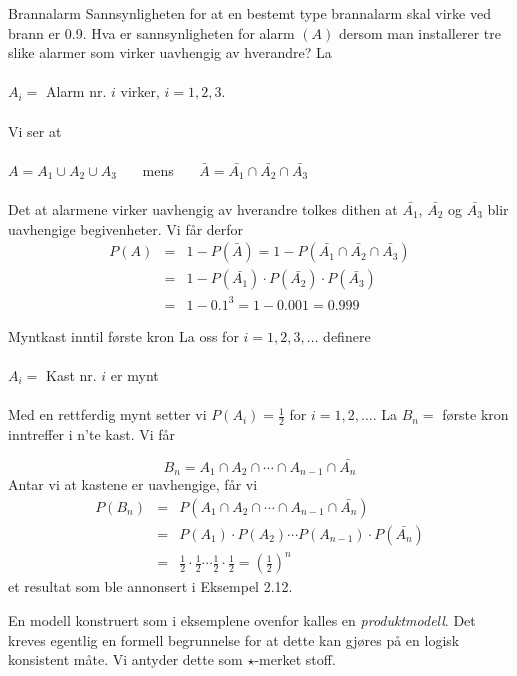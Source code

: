 \begin{eksempel}{Brannalarm}
Sannsynligheten for at en bestemt type brannalarm skal virke ved
brann er 0.9. Hva er sannsynligheten for alarm $(A)$ dersom man
installerer tre slike alarmer som virker uavhengig av hverandre?
La \\ \\
\indent  $A_i=$ Alarm nr. $i$ virker, $i=1,2,3$. \\ \\
\noindent Vi ser at \\ \\
\indent $A=A_1\cup A_2\cup A_3$  \ \ \ mens \ \ \
              $\bar{A}=\bar{A_1} \cap \bar{A_2} \cap \bar{A_3}$  \\ \\
Det at alarmene virker uavhengig av hverandre tolkes dithen at
 $\bar{A_1}$, $\bar{A_2}$ og $\bar{A_3}$ blir uavhengige begivenheter.
 Vi får derfor
 \begin{eqnarray*}
 P(A)&=&1-P(\bar{A})=1-P(\bar{A_1} \cap \bar{A_2} \cap \bar{A_3}) \\
     &=&1-P(\bar{A_1}) \cdot P(\bar{A_2}) \cdot P(\bar{A_3}) \\
     &=&1-0.1^3=1-0.001=0.999 
\end{eqnarray*}
\end{eksempel}

\begin{eksempel}{Myntkast inntil første kron}
La oss for $i=1,2,3,\ldots$ definere \\ \\
\indent     $A_i=$ Kast nr. $i$ er mynt \\ \\
Med en rettferdig mynt setter vi $P(A_i)=\frac{1}{2}$  for
$i=1,2,\ldots$.
La $B_n=$ første kron inntreffer i n'te kast. Vi får

\[  B_n=A_1\cap A_2\cap \cdots \cap A_{n-1}\cap \bar{A_n} \]
Antar vi at kastene er uavhengige, får vi
\begin{eqnarray*}
 P(B_n)&=&P(A_1\cap A_2\cap \cdots \cap A_{n-1}\cap \bar{A_n}) \\
       &=&P(A_1)\cdot P(A_2)\cdots P(A_{n-1}) \cdot P(\bar{A_n}) \\
       &=&\frac{1}{2} \cdot\frac{1}{2} \cdots \frac{1}{2} 
                  \cdot \frac{1}{2}={(\frac{1}{2})}^n
\end{eqnarray*}
\noindent et resultat som ble annonsert i Eksempel 2.12.
\end{eksempel}
En modell konstruert som i eksemplene ovenfor kalles en {\em
produktmodell}. Det kreves egentlig en formell begrunnelse for at
dette kan gjøres på en logisk konsistent måte. 
Vi antyder dette som $\star$-merket stoff.\\

